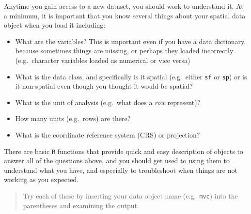 \documentclass[
]{book}
\providecommand{\tightlist}{%
  \setlength{\itemsep}{0pt}\setlength{\parskip}{0pt}}
\begin{document}
Anytime you gain access to a new dataset, you should work to understand it. At a minimum, it is important that you know several things about your spatial data object when you load it including:

\begin{itemize}
\tightlist
\item
  What are the variables? This is important even if you have a data dictionary, because sometimes things are missing, or perhaps they loaded incorrectly (e.g.~character variables loaded as numerical or vice versa)
\item
  What is the data class, and specifically is it spatial (e.g.~either \texttt{sf} or \texttt{sp}) or is it non-spatial even though you thought it would be spatial?
\item
  What is the unit of analysis (e.g.~what does a \emph{row} represent)?
\item
  How many units (e.g.~rows) are there?
\item
  What is the coordinate reference system (CRS) or projection?
\end{itemize}

There are basic \texttt{R} functions that provide quick and easy description of objects to answer all of the questions above, and you should get used to using them to understand what you have, and especially to troubleshoot when things are not working as you expected.

\begin{quote}
Try each of these by inserting your data object name (e.g.~\texttt{mvc}) into the parentheses and examining the output.
\end{quote}
\end{document}
